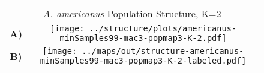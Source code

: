 \documentclass[border=10pt,varwidth=30cm]{standalone}
\begin{document}
\begin{figure}
\begin{tabular}[t]{cc}
    \multicolumn{2}{c}{\Large \textit{A. americanus} Population Structure, K=2} \\
  {\textbf{\large A)}} & \texttt{[image: ../structure/plots/americanus-minSamples99-mac3-popmap3-K-2.pdf]} \\ \vspace{1mm}
  {\textbf{\large B)}} & \texttt{[image: ../maps/out/structure-americanus-minSamples99-mac3-popmap3-K-2-labeled.pdf]} \\
\end{tabular}
\end{figure}
\end{document}
